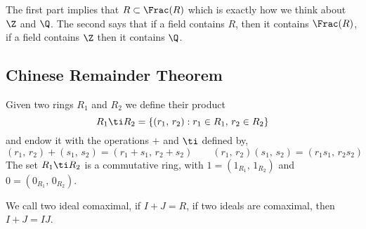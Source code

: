 The first part implies that $R \subset \Frac(R)$ which is exactly how we think about $\Z$ and $\Q$. The second says that if a field contains $R$, then it contains $\Frac(R)$, if a field contains $\Z$ then it contains $\Q$.

\subsection{Chinese Remainder Theorem}
Given two rings $R_1$ and $R_2$ we define their product
$$ R_1 \ti R_2 = \{(r_1,\,r_2) : r_1 \in R_1,\,r_2\in R_2\} $$
and endow it with the operations $+$ and $\ti$ defined by,
$$ (r_1,\,r_2) + (s_1,\,s_2) = (r_1 + s_1,\,r_2 + s_2) \qquad (r_1,\,r_2)(s_1,\,s_2) = (r_1s_1,\,r_2s_2) $$
The set $R_1 \ti R_2$  is a commutative ring, with $1 = (1_{R_1},\,1_{R_2})$ and $0 = (0_{R_1},\,0_{R_2})$.

\noindent
\begin{ndefi}[Comaximal]
  We call two ideal comaximal, if $I + J = R$, if two ideals are comaximal, then $I + J = IJ$.
\end{ndefi}

